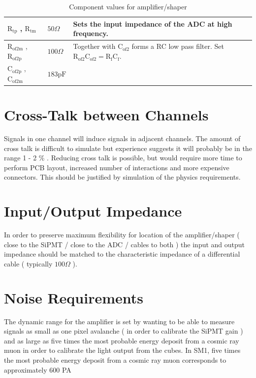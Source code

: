 \documentclass[
12pt, %
a4paper, %
oneside, %
headinclude,footinclude, %
apacite
]{scrartcl}
\begin{document}
\begin{table}[tb]
\begin{tabularx}{\textwidth}{|l|l|X|}
$\mathrm{R}_\mathrm{tp}$ , $\mathrm{R}_\mathrm{tm}$ &  $50\Omega$ & Sets the input impedance of the ADC at high frequency. \\ \midrule

$\mathrm{R}_\mathrm{of2m}$ , $\mathrm{R}_\mathrm{of2p}$ &  $100\Omega$ & Together with $\mathrm{C}_\mathrm{of2}$ forms a RC low pass filter. Set $\mathrm{R}_\mathrm{of2}\mathrm{C}_\mathrm{of2} = \mathrm{R}_\mathrm{f}\mathrm{C}_\mathrm{f}$. \\ \midrule

$\mathrm{C}_\mathrm{of2p}$ , $\mathrm{C}_\mathrm{of2m}$ &  $183\mathrm{pF}$ &  \\
\bottomrule

\end{tabularx}
\caption{Component values for amplifier/shaper}
\label{tab:component_values}
\end{table}

\section{Cross-Talk between Channels}

Signals in one channel will induce signals in adjacent channels. The amount of cross talk is difficult to simulate but experience suggests it will probably be in the range 1 - 2 \% . Reducing cross talk is possible, but would require more time to perform PCB layout, increased number of interactions and more expensive connectors. This should be justified by simulation of the physics requirements.

\section{Input/Output Impedance}

In order to preserve maximum flexibility for location of the amplifier/shaper ( close to the SiPMT / close to the ADC / cables to both ) the input and output impedance should be matched to the characteristic impedance of a differential cable ( typically $100\Omega$ ). 
 
\section{Noise Requirements}

The dynamic range for the amplifier is set by wanting to be able to measure signals as small as one pixel avalanche ( in order to calibrate the SiPMT gain ) and as large as five times the most probable energy deposit from a cosmic ray muon in order to calibrate the light output from the cubes. In SM1, five times the most probable energy deposit from a cosmic ray muon corresponds to approximately 600 PA~\cite{ref:cosmic_calibration}
\end{document}
